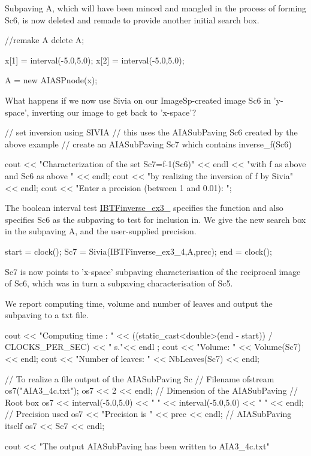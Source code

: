 \-Subpaving \-A, which will have been minced and mangled in the process of forming \-Sc6, is now deleted and remade to provide another initial search box.


\begin{DoxyCodeInclude}
  //remake A
  delete A;

  x[1] = interval(-5.0,5.0);
  x[2] = interval(-5.0,5.0);

  A = new AIASPnode(x);

\end{DoxyCodeInclude}


\-What happens if we now use \-Sivia on our \-Image\-Sp-\/created image \-Sc6 in 'y-\/space', inverting our image to get back to 'x-\/space'?


\begin{DoxyCodeInclude}
  // set inversion using SIVIA
  // this uses the AIASubPaving Sc6 created by the above example
  // create an AIASubPaving Sc7 which contains inverse_f(Sc6)

  cout << "Characterization of the set Sc7=f-1(Sc6)" << endl
    << "with f as above  and Sc6 as above " << endl;
  cout << "by realizing the inversion of f by Sivia" << endl;
  cout << "Enter a precision (between 1 and 0.01): ";

\end{DoxyCodeInclude}


\-The boolean interval test \hyperlink{AIASubPavings_IBTinverse_ex3_4}{\-I\-B\-T\-Finverse\-\_\-ex3\-\_} specifies the function and also specifies \-Sc6 as the subpaving to test for inclusion in. \-We give the new search box in the subpaving \-A, and the user-\/supplied precision.


\begin{DoxyCodeInclude}
  start = clock();
  Sc7 = Sivia(IBTFinverse_ex3_4,A,prec);
  end = clock();

\end{DoxyCodeInclude}


\-Sc7 is now points to 'x-\/space' subpaving characterisation of the reciprocal image of \-Sc6, which was in turn a subpaving characterisation of \-Sc5.

\-We report computing time, volume and number of leaves and output the subpaving to a txt file.


\begin{DoxyCodeInclude}
  cout << "Computing time : " 
       << ((static_cast<double>(end - start)) / CLOCKS_PER_SEC) << " s."<< endl
      ;
  cout << "Volume: " << Volume(Sc7) << endl;
  cout << "Number of leaves: " << NbLeaves(Sc7) << endl;

  // To realize a file output of the AIASubPaving Sc
                    // Filename
  ofstream os7("AIA3_4c.txt");
  os7 << 2 << endl; // Dimension of the AIASubPaving
                    // Root box
  os7 << interval(-5.0,5.0) << " "
    << interval(-5.0,5.0) << " " << endl;
                    // Precision used
  os7 << "Precision is " << prec << endl;
                    // AIASubPaving itself
  os7 << Sc7 << endl;

  cout << "The output AIASubPaving has been written to AIA3_4c.txt" 

\end{DoxyCodeInclude}


